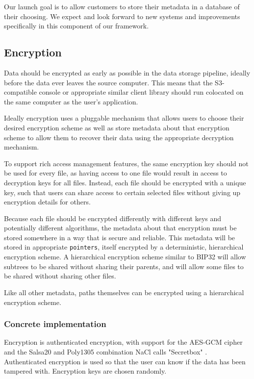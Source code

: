 \documentclass[a4paper,10pt]{article} \usepackage[utf8]{inputenc}
\newcommand{\x}[1]{{\tt #1}} \newcommand{\code}[1]{{\tt #1}}
\begin{document}
Our launch goal is to allow customers to store their metadata in a database of
their choosing. We expect and look forward to new systems and improvements
specifically in this component of our framework.

\subsection{Encryption}

Data should be encrypted as early as possible in the data storage pipeline,
ideally before the data ever leaves the source computer. This means that the
S3-compatible console or appropriate similar client library should run
colocated on the same computer as the user's application.

Ideally encryption uses a pluggable mechanism that allows users to choose their
desired encryption scheme as well as store metadata about that encryption
scheme to allow them to recover their data using the appropriate decryption
mechanism.

To support rich access management features, the same encryption key should not
be used for every file, as having access to one file would result in access
to decryption keys for all files. Instead, each file should be encrypted with
a unique key, such that users can share access to certain selected files
without giving up encryption details for others.

Because each file should be encrypted differently with different keys and
potentially different algorithms, the metadata about that encryption must
be stored somewhere in a way that is secure and reliable. This metadata will
be stored in appropriate \x{pointers}, itself encrypted by a deterministic,
hierarchical encryption scheme. A hierarchical encryption scheme similar to
BIP32 \cite{bip32} will allow subtrees to be shared without sharing their
parents, and will allow some files to be shared without sharing other files.

Like all other metadata, paths themselves can be encrypted using a hierarchical
encryption scheme.

\subsubsection{Concrete implementation}

Encryption is authenticated encryption, with support for the AES-GCM cipher
and the Salsa20 and Poly1305 combination NaCl calls "Secretbox"
\cite{nacl-crypto}. Authenticated encryption is used so that the user can know
if the data has been tampered with. Encryption keys are chosen randomly.
\end{document}
